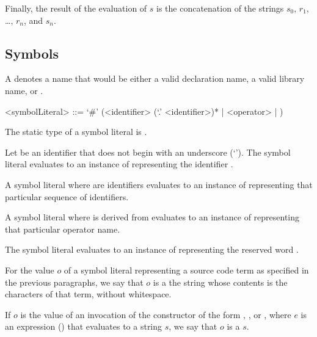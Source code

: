 \documentclass[makeidx]{article}
\begin{document}
{\LMHash{}%
Finally, the result of the evaluation of $s$ is
the concatenation of the strings $s_0$, $r_1$, \ldots, $r_n$, and $s_n$.


\subsection{Symbols}

\LMHash{}%
A 
denotes a name that would be either
a valid declaration name, a valid library name, or \VOID.

\begin{grammar}
<symbolLiteral> ::=
  `#' (<identifier> (`.' <identifier>)* | <operator> | \VOID)
\end{grammar}

\LMHash{}%
The static type of a symbol literal is .

\LMHash{}%
Let \id{} be an identifier that does not begin with an underscore
(`\code{\_}').
The symbol literal \code{\#\id}
evaluates to an instance of 
representing the identifier \id.

\LMHash{}%
A symbol literal 
where  are identifiers
evaluates to an instance of 
representing that particular sequence of identifiers.

\LMHash{}%
A symbol literal \code{\#\op}
where \op{} is derived from 
evaluates to an instance of 
representing that particular operator name.

\LMHash{}%
The symbol literal 
evaluates to an instance of 
representing the reserved word \VOID.

\LMHash{}%
For the value $o$ of a symbol literal representing a source code term
as specified in the previous paragraphs, we say that $o$ is a
the string whose contents is the characters of that term, without whitespace.


\LMHash{}%
If $o$ is the value of an invocation of the  constructor
of the form
, ,
or ,
where $e$ is an expression
()
that evaluates to a string $s$,
we say that $o$ is a  $s$.

}
\end{document}
